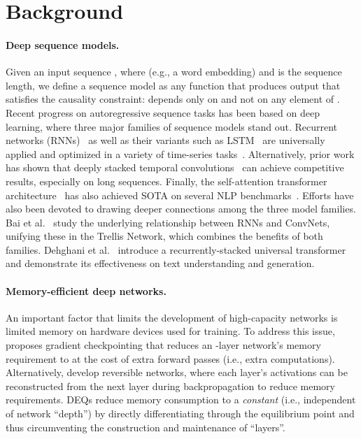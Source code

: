 \documentclass{article}
\begin{document}
\section{Background}
\label{sec:background}

\paragraph{Deep sequence models.} Given an input sequence , where  (e.g., a word embedding) and  is the sequence length, we define a sequence model as any function  that produces output 
that satisfies the causality constraint:  depends only on  and not on any element of . Recent progress on autoregressive sequence tasks has been based on deep learning, where three major families of sequence models stand out. Recurrent networks (RNNs)~\citep{Elman90findstructure,Werbos1990} as well as their variants such as LSTM~\citep{hochreiterLSTM} are universally applied and optimized in a variety of time-series tasks~\citep{bradbury2016quasi,gal2016dropout,merityRegOpt}. Alternatively, prior work has shown that deeply stacked temporal convolutions~\citep{waibel,waveNet,dauphinGatedConv,bai2018empirical} can achieve competitive results, especially on long sequences. Finally, the self-attention transformer architecture~\citep{vaswani2017attention,dai2018transformer} has also achieved SOTA on several NLP benchmarks~\citep{devlin2018bert,child2019generating}. Efforts have also been devoted to drawing deeper connections among the three model families. Bai et al.~\cite{bai2018trellis} study the underlying relationship between RNNs and ConvNets, unifying these in the Trellis Network, which combines the benefits of both families. Dehghani et al.~\cite{dehghani2018universal} introduce a recurrently-stacked universal transformer and demonstrate its effectiveness on text understanding and generation.

\vspace{-2mm}
\paragraph{Memory-efficient deep networks.} An important factor that limits the development of high-capacity networks is limited memory on hardware devices used for training. To address this issue, \cite{chen2016training} proposes gradient checkpointing that reduces an -layer network's memory requirement to  at the cost of extra forward passes (i.e., extra computations). Alternatively, \cite{gomez2017reversible,MacKay2018} develop reversible networks, where each layer's activations can be reconstructed from the next layer during backpropagation to reduce memory requirements. DEQs reduce memory consumption to a \emph{constant} (i.e., independent of network ``depth'') by directly differentiating through the equilibrium point and thus circumventing the construction and maintenance of ``layers''.
\end{document}
